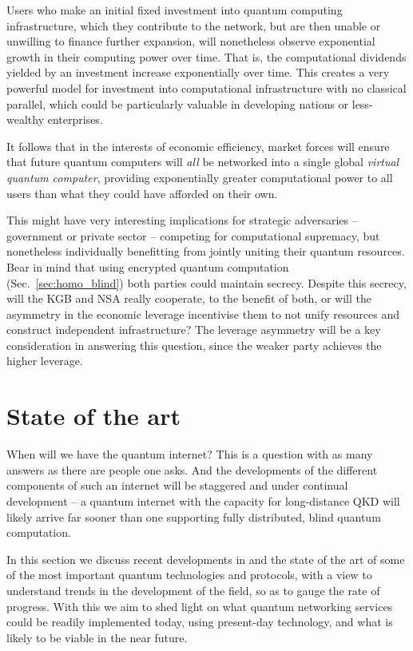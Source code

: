 \documentclass[aps, rmp, twocolumn, amsmath, amssymb, nofootinbib, superscriptaddress, longbibliography, floatfix, table-of-contents, eqsecnum]{revtex4-1}
\renewcommand{\tablename}{ALG.}
\begin{document}
Users who make an initial fixed investment into quantum computing infrastructure, which they contribute to the network, but are then unable or unwilling to finance further expansion, will nonetheless observe exponential growth in their computing power over time. That is, the computational dividends yielded by an investment increase exponentially over time. This creates a very powerful model for investment into computational infrastructure with no classical parallel, which could be particularly valuable in developing nations or less-wealthy enterprises.

It follows that in the interests of economic efficiency, market forces will ensure that future quantum computers will \textit{all} be networked into a single global \textit{virtual quantum computer}, providing exponentially greater computational power to all users than what they could have afforded on their own.

This might have very interesting implications for strategic adversaries -- government or private sector -- competing for computational supremacy, but nonetheless individually benefitting from jointly uniting their quantum resources. Bear in mind that using encrypted quantum computation (Sec.~\ref{sec:homo_blind}) both parties could maintain secrecy. Despite this secrecy, will the KGB and NSA really cooperate, to the benefit of both, or will the asymmetry in the economic leverage incentivise them to not unify resources and construct independent infrastructure? The leverage asymmetry will be a key consideration in answering this question, since the weaker party achieves the higher leverage.

%
%

\section{State of the art} \label{sec:state_of_the_art} 

\renewcommand{\tablename}{TABLE}

When will we have the quantum internet? This is a question with as many answers as there are people one asks. And the developments of the different components of such an internet will be staggered and under continual development -- a quantum internet with the capacity for long-distance QKD will likely arrive far sooner than one supporting fully distributed, blind quantum computation.

In this section we discuss recent developments in and the state of the art of some of the most important quantum technologies and protocols, with a view to understand trends in the development of the field, so as to gauge the rate of progress. With this we aim to shed light on what quantum networking services could be readily implemented today, using present-day technology, and what is likely to be viable in the near future.
\end{document}
